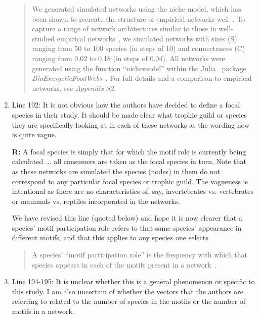 \documentclass[12pt]{article}
\begin{document}
\begin{enumerate}
                \begin{quotation}
                We generated simulated networks using the niche model, which has been shown to recreate the structure of empirical networks well~\citep{Williams2000,Stouffer2007}.
                To capture a range of network architectures similar to those in well-studied empirical networks~\citep{Dunne2002,Dunne2002a}, we simulated networks with sizes (S) ranging from 50 to 100 species (in steps of 10) and connectances (C) ranging from 0.02 to 0.18 (in steps of 0.04). 
                All networks were generated using the function ``nichemodel'' within the Julia~\citep{Bezanson2017julia} package \emph{BioEnergeticFoodWebs}~\citep{bioenergfw,Delmas2017}.   
                For full details and a comparison to empirical networks, see \emph{Appendix S2}.
                \end{quotation}


            \item Line 192: It is not obvious how the authors have decided to define a focal species in their study. It should be made clear what trophic guild or species they are specifically looking at in each of these networks as the wording now is quite vague.

                \textbf{R:} A focal species is simply that for which the motif role is currently being calculated ... all consumers are taken as the focal species in turn. Note that as these networks are simulated the species (nodes) in them do not correspond to any particular focal species or trophic guild. The vagueness is intentional as there are no characteristics of, say, invertebrates vs. vertebrates or mammals vs. reptiles incorporated in the networks. 

                We have revised this line (quoted below) and hope it is now clearer that a species' motif participation role refers to that same species' appearance in different motifs, and that this applies to any species one selects.
                \begin{quotation}
                A species' ``motif participation role'' is the frequency with which that species appears in each of the motifs present in a network~\citep{Stouffer2012}.
                \end{quotation}


            \item Line 194-195: It is unclear whether this is a general phenomenon or specific to this study. I am also uncertain of whether the vectors that the authors are referring to related to the number of species in the motifs or the number of motifs in a network.


\end{enumerate}
\end{document}
